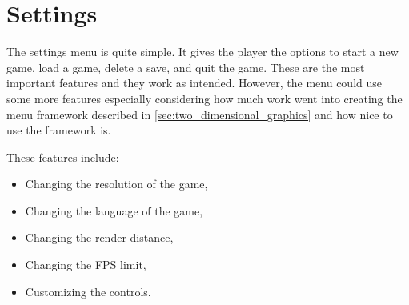 \section{Settings}
The settings menu is quite simple.
It gives the player the options to start a new game, load a game, delete a save, and quit the game.
These are the most important features and they work as intended.
However, the menu could use some more features especially considering how much work went into creating the menu framework described in \autoref{sec:two_dimensional_graphics} and how nice to use the framework is.

These features include:
\begin{itemize}
    \item Changing the resolution of the game,
    \item Changing the language of the game,
    \item Changing the render distance,
    \item Changing the FPS limit,
    \item Customizing the controls.
\end{itemize}